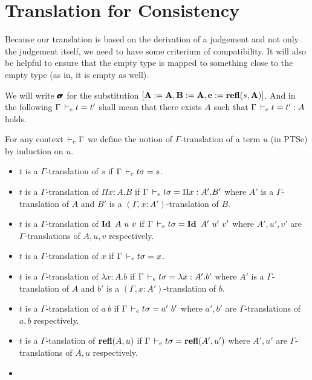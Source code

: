 \documentclass[a4paper,english]{lipics-utf8x}
\begin{document}
  \section{Translation for Consistency}

  Because our translation is based on the derivation of a judgement and not
  only the judgement itself, we need to have some criterium of compatibility.
  It will also be helpful to ensure that the empty type is mapped to something
  close to the empty type (as in, it is empty as well).

  We will write $\operatorname{\pmb{\bm{\sigma}}}$ for the substitution
  $[\operatorname{\mathbf{A}} := \operatorname{\mathbf{A}}, \operatorname{\mathbf{B}} := \operatorname{\mathbf{A}}, \operatorname{\mathbf{e}} := \operatorname{\mathbf{refl}}(s,\operatorname{\mathbf{A}})]$.
  And in the following $\Gamma \,\vdash_e t = t'$ shall mean that there exists $A$
  such that $\Gamma \,\vdash_e t = t' : A$ holds.

  \begin{definition}
    For any context $\,\vdash_e \Gamma$ we define the notion of $\Gamma$-translation
    of a term $u$ (in PTSe) by induction on $u$.
    \begin{itemize}
      \item $t$ is a $\Gamma$-translation of $s$ if $\Gamma \,\vdash_e t \sigma = s$.
      \item $t$ is a $\Gamma$-translation of $\Pi x:A.B$ if
            $\Gamma \,\vdash_e t \sigma = \Pi x:A'.B'$ where $A'$ is a
            $\Gamma$-translation of $A$ and $B'$ is a
            $(\Gamma, x:A')$-translation of $B$.
      \item $t$ is a $\Gamma$-translation of $\operatorname{\mathbf{Id}~} A\ u\ v$ if
            $\Gamma \,\vdash_e t \sigma = \operatorname{\mathbf{Id}~} A'\ u'\ v'$ where $A',u',v'$ are
            $\Gamma$-translations of $A,u,v$ respectively.
      \item $t$ is a $\Gamma$-translation of $x$ if $\Gamma \,\vdash_e t \sigma = x$.
      \item $t$ is a $\Gamma$-translation of $\lambda x:A.b$ if
            $\Gamma \,\vdash_e t \sigma = \lambda x:A'.b'$ where $A'$ is a
            $\Gamma$-translation of $A$ and $b'$ is a
            $(\Gamma, x:A')$-translation of $b$.
      \item $t$ is a $\Gamma$-translation of $a\ b$ if
            $\Gamma \,\vdash_e t \sigma = a'\ b'$ where $a',b'$ are
            $\Gamma$-translations of $a,b$ respectively.
      \item $t$ is a $\Gamma$-tanslation of $\operatorname{\mathbf{refl}}(A,u)$ if
            $\Gamma \,\vdash_e t \sigma = \operatorname{\mathbf{refl}}(A',u')$ where $A',u'$ are
            $\Gamma$-translations of $A,u$ respectively.
      \item \sloppy

\end{itemize}
\end{definition}
\end{document}
